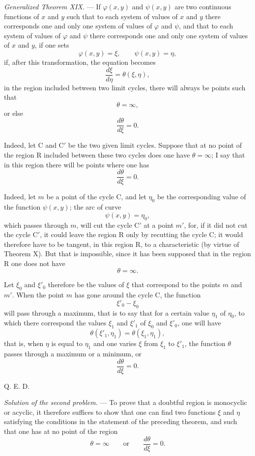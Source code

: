 \documentclass[11pt]{article}
\begin{document}
\emph{Generalized Theorem XIX.} --- If $\varphi(x,y)$ and $\psi(x,y)$ are two continuous functions of $x$ and $y$ such that to each system of values of $x$ and $y$ there corresponds one and only one system of values of $\varphi$ and $\psi$, and that to each system of values of $\varphi$ and $\psi$ there corresponds one and only one system of values of $x$ and $y$,
if one sets
\[
\varphi(x,y)=\xi,
\qquad
\psi(x,y)=\eta,
\]
if, after this transformation, the equation becomes
\[
\frac{d\xi}{d\eta}=\theta(\xi,
\eta),
\]
in the region included between two limit cycles, there will always be points such that
\[
\theta=\infty,
\]
or else
\[
\frac{d\theta}{d\xi}=0.
\]

Indeed, let C and C$'$ be the two given limit cycles. Suppose that at no point of the region R included between these two cycles does one have $\theta=\infty$; I say that in this region there will be points where one has
\[
\frac{d\theta}{d\xi}=0.
\]

Indeed, let $m$ be a point of the cycle C, and let $\eta_0$ be the corresponding value of the function $\psi(x,y)$; the arc of curve
\[
\psi(x,y)=\eta_0,
\]
which passes through $m$, will cut the cycle C$'$ at a point $m'$, for, if it did not cut the cycle C$'$, it could leave the region R only by recutting the cycle C; it would therefore have to be tangent, in this region R, to a characteristic (by virtue of Theorem X). But that is impossible, since it has been supposed that in the region R one does not have
\[
\theta=\infty.
\]

Let $\xi_0$ and $\xi'_0$ therefore be the values of $\xi$ that correspond to the points $m$ and $m'$. When the point $m$ has gone around the cycle C, the function
\[
\xi'_0-\xi_0
\]
will pass through a maximum, that is to say that for a certain value $\eta_1$ of $\eta_0$, to which there correspond the values $\xi_1$ and $\xi'_1$ of $\xi_0$ and $\xi'_0$, one will have
\[
\theta(\xi'_1,\eta_1)=\theta(\xi_1,\eta_1),
\]
that is, when $\eta$ is equal to $\eta_1$ and one varies $\xi$ from $\xi_1$ to $\xi'_1$, the function $\theta$ passes through a maximum or a minimum, or
\[
\frac{d\theta}{d\xi}=0.
\]
\begin{flushright}Q. E. D.\end{flushright}

\emph{Solution of the second problem.} --- To prove that a doubtful region is monocyclic or acyclic, it therefore suffices to show that one can find two functions $\xi$ and $\eta$ satisfying the conditions in the statement of the preceding theorem, and such that one has at no point of the region
\[
\theta=\infty
\qquad\text{or}\qquad
\frac{d\theta}{d\xi}=0.
\]
\end{document}
